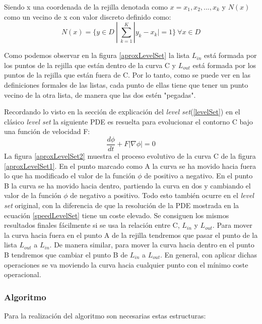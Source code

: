 Siendo x una coordenada de la rejilla denotada como $x = {x_1,x_2,...,x_k}$ y $N(x)$ como un vecino de x con valor discreto definido como:
\begin{equation}
N(x) = \{y \in D \ | \ \sum_{k=1}^{K} |y_k - x_k| = 1\}  \ \forall x \in D
\end{equation}

Como podemos observar en la figura \ref{aproxLevelSet} la lista $L_{in}$ est\'{a} formada por los puntos de la rejilla que est\'{a}n dentro de la curva C y $L_{out}$ est\'{a} formada por los puntos de la rejilla que est\'{a}n fuera de C. Por lo tanto, como se puede ver en las definiciones formales de las listas, cada punto de ellas tiene que tener un punto vecino de la otra lista, de manera que las dos est\'{e}n "pegadas".

Recordando lo visto en la secci\'{o}n de explicaci\'{o}n del \textit{level set}(\ref{levelSet}) en el cl\'{a}sico \textit{level set} la siguiente PDE es resuelta para evolucionar el contorno C bajo una funci\'{o}n de velocidad F:
\begin{equation}\label{speedLevelSet}
\frac{d\phi}{dt} + F|\nabla \phi| = 0
\end{equation}
La figura \ref{aproxLevelSet2} muestra el proceso evolutivo de la curva C de la figura \ref{aproxLevelSet1}. En el punto marcado como A la curva se ha movido hacia fuera lo que ha modificado el valor de la funci\'{o}n $\phi$ de positivo a negativo. En el punto B la curva se ha movido hacia dentro, partiendo la curva en dos y cambiando el valor de la funci\'{o}n $\phi$ de negativo a positivo. Todo esto tambi\'{e}n ocurre en el \textit{level set} original, con la diferencia de que la resoluci\'{o}n de la PDE mostrada en la ecuaci\'{o}n \ref{speedLevelSet} tiene un coste elevado. Se consiguen los mismos resultados finales f\'{a}cilmente si se usa la relaci\'{o}n entre C, $L_{in}$ y $L_{out}$. Para mover la curva hacia fuera en el punto A de la rejilla tendremos que pasar el punto de la lista $L_{out}$ a $L_{in}$. De manera similar, para mover la curva hacia dentro en el punto B tendremos que cambiar el punto B de $L_{in}$ a $L_{out}$. En general, con aplicar dichas operaciones se va moviendo la curva hacia cualquier punto con el m\'{i}nimo coste operacional. 


\subsubsection{Algoritmo}

Para la realizaci\'{o}n del algoritmo son necesarias estas estructuras:

